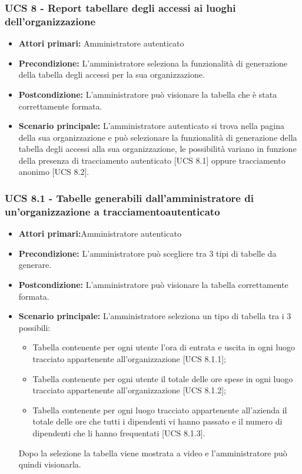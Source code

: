 \subsubsection{UCS 8 - Report tabellare degli accessi ai luoghi dell'organizzazione}%
\begin{itemize}
\item \textbf{Attori primari:} Amministratore autenticato
\item \textbf{Precondizione:} L'amministratore seleziona la funzionalità di generazione della tabella degli accessi per la sua organizzazione.
\item \textbf{Postcondizione:} L'amministratore può visionare la tabella che è stata correttamente formata.
\item \textbf{Scenario principale:} L'amministratore autenticato si trova nella pagina della sua organizzazione e può selezionare la funzionalità di generazione della tabella degli accessi alla sua organizzazione, le possibilità variano in funzione della presenza di tracciamento autenticato [UCS 8.1] oppure tracciamento anonimo [UCS 8.2].
\end{itemize}

\subsubsection{UCS 8.1 - Tabelle generabili dall'amministratore di un'organizzazione a tracciamentoautenticato}%
\begin{itemize}
\item \textbf{Attori primari:}Amministratore autenticato
\item \textbf{Precondizione:} L'amministratore può scegliere tra 3 tipi di tabelle da generare.
\item \textbf{Postcondizione:} L'amministratore può visionare la tabella correttamente formata.
\item \textbf{Scenario principale:} L'amministratore seleziona un tipo di tabella tra i 3 possibili:
	\begin{itemize}%
	\item Tabella contenente per ogni utente l'ora di entrata e uscita in ogni luogo tracciato appartenente all'organizzazione [UCS 8.1.1];
	\item Tabella contenente per ogni utente il totale delle ore spese in ogni luogo tracciato appartenente all'organizzazione [UCS 8.1.2];
	\item Tabella contenente per ogni luogo tracciato appartenente all'azienda il totale delle ore che tutti i dipendenti vi hanno passato e il numero di dipendenti che li hanno frequentati [UCS 8.1.3].
\end{itemize}
Dopo la selezione la tabella viene mostrata a video e l'amministratore può quindi visionarla.
\end{itemize}

